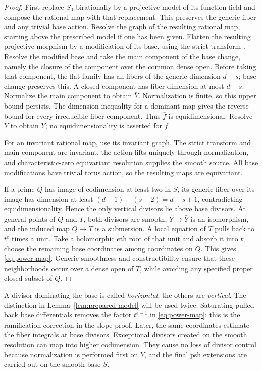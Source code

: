 \begin{proof}
First replace $S_0$ birationally by a projective model of its function
field and compose the rational map with that replacement. This preserves
the generic fiber and any trivial base action.
Resolve the graph of the resulting rational map, starting above the prescribed
model if one has been given. Flatten the resulting projective morphism
by a modification of its base, using the strict transform
\cite{RaynaudGruson1971}. Resolve the modified base and take the main
component of the base change, namely the closure of the component over
the common dense open. Before taking that component, the flat family
has all fibers of the generic dimension $d-s$; base change preserves
this. A closed component has fiber dimension at most $d-s$.
Normalize the main component to obtain $\bar Y$. Normalization is
finite, so this upper bound persists. The dimension inequality for a
dominant map gives the reverse bound for every irreducible fiber
component. Thus $\bar f$ is equidimensional. Resolve $\bar Y$ to
obtain $Y$; no equidimensionality is asserted for $f$.

For an invariant rational map, use its invariant graph. The strict
transform and main component are invariant, the action lifts uniquely
through normalization, and characteristic-zero equivariant resolution
supplies the smooth source. All base modifications have trivial torus
action, so the resulting maps are equivariant.

If a prime $Q$ has image of codimension at least two in $S$, its generic
fiber over its image has dimension at least
$(d-1)-(s-2)=d-s+1$, contradicting equidimensionality. Hence the only
vertical divisors lie above base divisors. At general points of $Q$
and $T$, both divisors are smooth, $Y\to\bar Y$ is an isomorphism,
and the induced map $Q\to T$ is a submersion. A local equation of $T$
pulls back to $t^e$ times a unit. Take a holomorphic $e$th root of that
unit and absorb it into $t$; choose the remaining base coordinates
among coordinates on $Q$. This gives \eqref{eq:power-map}. Generic
smoothness and constructibility ensure that these neighborhoods occur
over a dense open of $T$, while avoiding any specified proper closed
subset of $Q$.
\end{proof}

A divisor dominating the base is called \emph{horizontal}; the others
are \emph{vertical}. The distinction in Lemma~\ref{lem:prepared-model}
will be used twice. Saturating pulled-back base differentials removes
the factor $t^{e-1}$ in \eqref{eq:power-map}; this is the ramification
correction in the slope proof. Later, the same coordinates estimate the
fiber integrals at base divisors. Exceptional divisors created on the
smooth resolution can map into higher codimension. They cause no loss
of divisor control because normalization is performed first on
$\bar Y$, and the final psh extensions are carried out on the smooth
base $S$.
